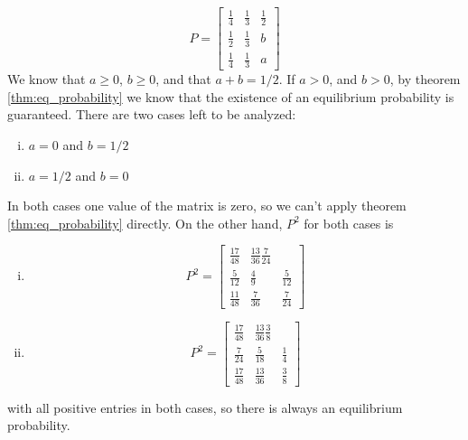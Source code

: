 \vspace{2mm}
$$
P=\left[\begin{array}{ccc}
				\frac{1}{4}&\frac{1}{3}&\frac{1}{2}\\ \frac{1}{2}&\frac{1}{3}&b\\ \frac{1}{4}&\frac{1}{3}&a
        \end{array}
  \right]
$$
We know that $a\ge0$, $b\ge0$, and that $a+b=1/2$. If $a>0$, and $b>0$, by theorem \ref{thm:eq_probability} we know that the existence of an equilibrium probability is guaranteed. There are two cases left to be analyzed:
\begin{enumerate}[i)]
  \item $a=0$ and $b=1/2$
	\item $a=1/2$ and $b=0$
\end{enumerate}
In both cases one value of the matrix is zero, so we can't apply theorem \ref{thm:eq_probability} directly. On the other hand, $P^2$ for both cases is
\begin{enumerate}[i)]
  \item
$$
P^2=\left[\begin{array}{ccc}
\frac{17}{48}&\frac{13}{36}\frac{7}{24}\\\frac{5}{12}&\frac{4}{9}&\frac{5}{12}\\\frac{11}{48}&\frac{7}{36}&\frac{7}{24}
\end{array}
\right]
$$
	\item
$$
P^2=\left[\begin{array}{ccc}
\frac{17}{48}&\frac{13}{36}\frac{3}{8}\\\frac{7}{24}&\frac{5}{18}&\frac{1}{4}\\\frac{17}{48}&\frac{13}{36}&\frac{3}{8}
\end{array}
\right]
$$
\end{enumerate}
with all positive entries in both cases, so there is always an equilibrium probability.

